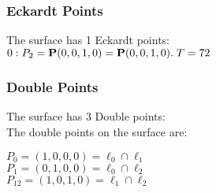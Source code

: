 \documentclass{article}
\newcommand{\bP}{{\bf P}}
\begin{document}
{\subsubsection*{Eckardt Points}
The surface has 1 Eckardt points:\\
$0 : P_{2}=\bP(0, 0, 1, 0) = \bP(0, 0, 1, 0).\; T= 72$\\
\subsubsection*{Double Points}
The surface has 3 Double points:\\
The double points on the surface are:\\
\begin{multicols}{2}
\noindent
$P_{0} = ( 1, 0, 0, 0 ) = \ell_{0} \cap \ell_{1} $\\
$P_{1} = ( 0, 1, 0, 0 ) = \ell_{0} \cap \ell_{2} $\\
$P_{12} = ( 1, 0, 1, 0 ) = \ell_{1} \cap \ell_{2} $\\
\end{multicols}
}
\end{document}
